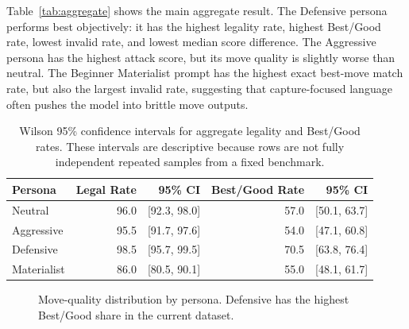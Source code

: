 \documentclass[10pt]{article}
\begin{document}
Table~\ref{tab:aggregate} shows the main aggregate result. The Defensive persona performs best objectively: it has the highest legality rate, highest Best/Good rate, lowest invalid rate, and lowest median score difference. The Aggressive persona has the highest attack score, but its move quality is slightly worse than neutral. The Beginner Materialist prompt has the highest exact best-move match rate, but also the largest invalid rate, suggesting that capture-focused language often pushes the model into brittle move outputs.

\begin{table}[!htbp]
\centering
\small
\begin{tabular}{lrrrr}
\toprule
Persona & Legal Rate & 95\% CI & Best/Good Rate & 95\% CI\\
\midrule
Neutral & 96.0 & [92.3, 98.0] & 57.0 & [50.1, 63.7]\\
Aggressive & 95.5 & [91.7, 97.6] & 54.0 & [47.1, 60.8]\\
Defensive & 98.5 & [95.7, 99.5] & 70.5 & [63.8, 76.4]\\
Materialist & 86.0 & [80.5, 90.1] & 55.0 & [48.1, 61.7]\\
\bottomrule
\end{tabular}
\caption{Wilson 95\% confidence intervals for aggregate legality and Best/Good rates. These intervals are descriptive because rows are not fully independent repeated samples from a fixed benchmark.}
\label{tab:ci}
\end{table}

\begin{figure}[!htbp]
\centering
{}
\caption{Move-quality distribution by persona. Defensive has the highest Best/Good share in the current dataset.}
\label{fig:quality}
\end{figure}
\end{document}
